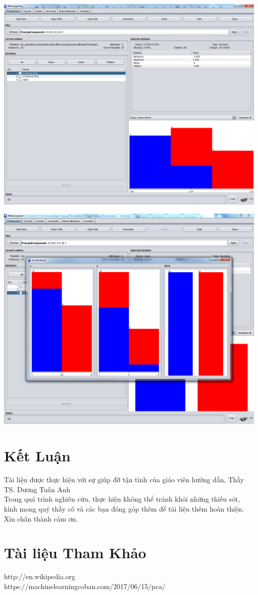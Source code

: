 \documentclass{hcmutarticle}
\begin{document}
\begin{center}
	\includegraphics[scale=0.5]{image/result_1.png}
\end{center}

\begin{center}
	\includegraphics[scale=0.5]{image/resultAll.png}
\end{center}

\section{Kết Luận }\label{result}
Tài liệu được thực hiện  với sự giúp đỡ tận tình của giáo viên hướng dẫn, Thầy TS. Dương Tuấn Anh\\
Trong quá trình nghiên cứu, thực hiện không thể tránh khỏi những  thiếu sót, kính mong quý thầy  cô và các bạn đóng góp thêm để tài liệu thêm hoàn thiện.\\
Xin chân thành cảm ơn.


\section{Tài liệu Tham Khảo }




http://en.wikipedia.org\\
https://machinelearningcoban.com/2017/06/15/pca/ \\

\end{document}

